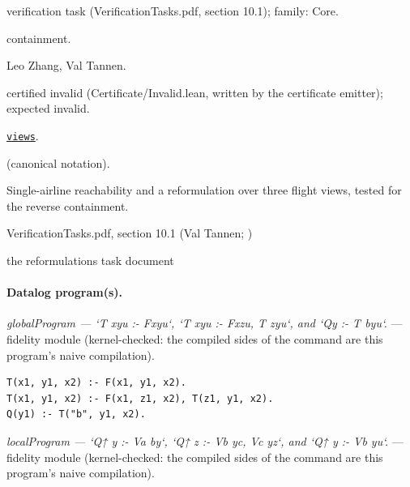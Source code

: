 \documentclass[10pt]{article}
\begin{document}
\begin{description}[leftmargin=2.6cm,style=nextline,itemsep=1pt]

\item[Category] verification task (VerificationTasks.pdf, section 10.1); family: Core.

\item[Kind] containment.

\item[Contributors] Leo Zhang, Val Tannen.

\item[Status] certified invalid (Certificate/Invalid.lean, written by the certificate emitter); expected invalid.

\item[Tags] \hyperref[tag:views]{\texttt{views}}.

\item[Input]  (canonical notation).

\item[Summary] Single-airline reachability and a reformulation over three flight views, tested for the reverse containment.

\item[Sources] {\raggedright VerificationTasks.pdf, section 10.1 (Val Tannen; ) \par the reformulations task document\par}

\end{description}

\paragraph{Datalog program(s).}

{\raggedright\textit{globalProgram --- `T xyu :- Fxyu`, `T xyu :- Fxzu, T zyu`, and `Qy :- T byu`.} --- fidelity module (kernel-checked: the compiled sides of the command are this program's naive compilation).\par}

\begin{Verbatim}[fontsize=\scriptsize,breaklines=true,breakanywhere=true,frame=single,framesep=1.5mm]
T(x1, y1, x2) :- F(x1, y1, x2).
T(x1, y1, x2) :- F(x1, z1, x2), T(z1, y1, x2).
Q(y1) :- T("b", y1, x2).
\end{Verbatim}

{\raggedright\textit{localProgram --- `Q↑ y :- Va by`, `Q↑ z :- Vb yc, Vc yz`, and `Q↑ y :- Vb yu`.} --- fidelity module (kernel-checked: the compiled sides of the command are this program's naive compilation).\par}
\end{document}
